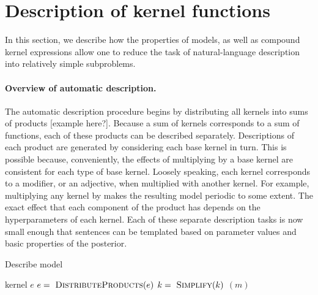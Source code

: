 \documentclass{article}
\begin{document}







\section{Description of kernel functions}
\label{sec:description}

In this section, we describe how the properties of \gp{} models, as well as compound kernel expressions allow one to reduce the task of natural-language description into relatively simple subproblems.

\paragraph{Overview of automatic description.}

The automatic description procedure begins by distributing all kernels into sums of products [example here?].
Because a sum of kernels corresponds to a sum of functions, each of these products can be described separately.
Descriptions of each product are generated by considering each base kernel in turn.
This is possible because, conveniently, the effects of multiplying by a base kernel are consistent for each type of base kernel.
Loosely speaking, each kernel corresponds to a modifier, or an adjective, when multiplied with another kernel.
For example, multiplying any kernel by \kPer makes the resulting model periodic to some extent.
The exact effect that each component of the product has depends on the hyperparameters of each kernel.
Each of these separate description tasks is now small enough that sentences can be templated based on parameter values and basic properties of the posterior.

\begin{algorithm}[tb]
   \caption{Describe model}
   \label{alg:description}
\begin{algorithmic}
    kernel $e$
   \STATE $e = {\textnormal{ \sc DistributeProducts}}(e)$
       \STATE $k = {\textnormal{ \sc Simplify}}(k)$
             $(m)$
     \ENDFOR
   \ENDFOR
\end{algorithmic}
\end{algorithm}
\end{document}
